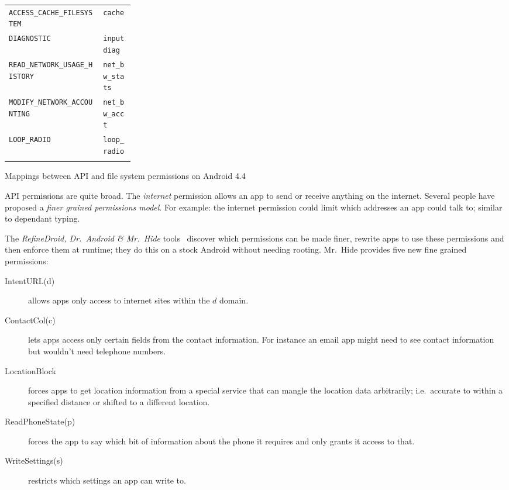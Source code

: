 \documentclass[a4paper]{article}
\begin{document}
\begin{marginfigure}
\begin{tabular}{l p{0.25\linewidth}}
\addlinespace
\texttt{ACCESS\_CACHE\_FILESYSTEM}       & \texttt{cache                        }    \\
\addlinespace
\texttt{DIAGNOSTIC}                      & \texttt{input    diag                }    \\
\addlinespace        
\texttt{READ\_NETWORK\_USAGE\_HISTORY}   & \texttt{net\_bw\_stats                 }  \\
\addlinespace
\texttt{MODIFY\_NETWORK\_ACCOUNTING}     & \texttt{net\_bw\_acct                  }  \\
\addlinespace
\texttt{LOOP\_RADIO}                     & \texttt{loop\_radio                   }   \\
\bottomrule                             \\
  \end{tabular}
  \caption{Mappings between API and file system permissions on Android 4.4}
  \label{tab:perms}
\end{marginfigure}


API permissions are quite broad. 
The \emph{internet} permission allows an app to send or receive anything on the
internet. Several people have proposed a \emph{finer grained permissions model}.
For example: the internet permission could limit which addresses an app could
talk to; similar to dependant typing.

The \emph{RefineDroid, Dr.~Android \& Mr.~Hide} tools~\cite{Jeon:2012ki} discover
which permissions can be made finer, rewrite apps to use these permissions and
then enforce them at runtime; they do this on a stock Android without needing
rooting.  Mr.\ Hide provides five new fine grained permissions:

\begin{description}
  \item[IntentURL(d)] allows apps only access to internet sites within the
    $d$ domain.
  \item[ContactCol(c)] lets apps access only certain fields from the contact
    information.  For instance an email app might need to see contact
    information but wouldn't need telephone numbers.
  \item[LocationBlock] forces apps to get location information from a special
    service that can mangle the location data arbitrarily; i.e.\ accurate to within
    a specified distance or shifted to a different location.
  \item[ReadPhoneState(p)] forces the app to say which bit of information about
    the phone it requires and only grants it access to that.
  \item[WriteSettings(s)] restricts which settings an app can write to.
\end{description}
\end{document}
